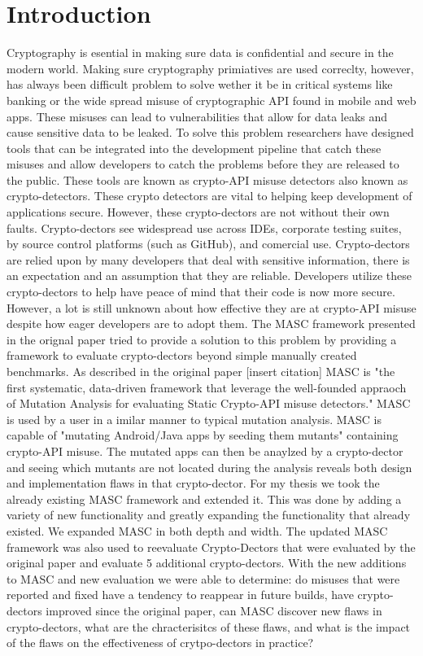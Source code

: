 \chapter{Introduction}
\label{chap_intro}


Cryptography is esential in making sure data is confidential and secure in the modern world. Making sure cryptography primiatives are used correclty, however, has always been difficult problem to solve wether it be in critical systems like banking or the wide spread misuse of cryptographic API found in mobile and web apps. These misuses can lead to vulnerabilities that allow for data leaks and cause sensitive data to be leaked. To solve this problem researchers have designed tools that can be integrated into the development pipeline that catch these misuses and allow developers to catch the problems before they are released to the public. These tools are known as crypto-API misuse detectors also known as crypto-detectors. These crypto detectors are vital to helping keep development of applications secure. However, these crypto-dectors are not without their own faults.
Crypto-dectors see widespread use across IDEs, corporate testing suites, by source control platforms (such as GitHub), and comercial use. Crypto-dectors are relied upon by many developers that deal with sensitive information, there is an expectation and an assumption that they are reliable. Developers utilize these crypto-dectors to help have peace of mind that their code is now more secure. However, a lot is still unknown about how effective they are at crypto-API misuse despite how eager developers are to adopt them. The MASC framework presented in the orignal paper tried to provide a solution to this problem by providing a framework to evaluate crypto-dectors beyond simple manually created benchmarks.
As described in the original paper [insert citation] MASC is "the first systematic, data-driven framework that leverage the well-founded appraoch of Mutation Analysis for evaluating Static Crypto-API misuse detectors." MASC is used by a user in a imilar manner to typical mutation analysis. MASC is capable of "mutating Android/Java apps by seeding them mutants" containing crypto-API misuse. The mutated apps can then be anaylzed by a crypto-dector and seeing which mutants are not located during the analysis reveals both design and implementation flaws in that crypto-dector.
For my thesis we took the already existing MASC framework and extended it. This was done by adding a variety of new functionality and greatly expanding the functionality that already existed. We expanded MASC in both depth and width. The updated MASC framework was also used to reevaluate  Crypto-Dectors that were evaluated by the original paper and evaluate 5 additional crypto-dectors. With the new additions to MASC and new evaluation we were able to determine: do misuses that were reported and fixed have a tendency to reappear in future builds, have crypto-dectors improved since the original paper, can MASC discover new flaws in crypto-dectors, what are the chracterisitcs of these flaws, and what is the impact of the flaws on the effectiveness of crytpo-dectors in practice?



